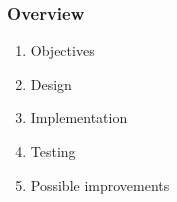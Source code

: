 \begin{frame}
    \frametitle{Overview}
    \begin{enumerate}
        \item Objectives
        \item Design
        \item Implementation
        \item Testing
        \item Possible improvements
    \end{enumerate}
\end{frame}
